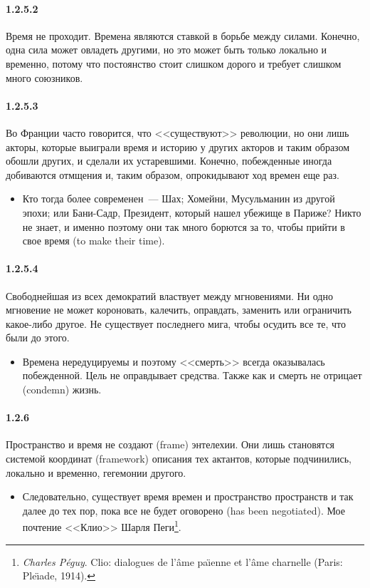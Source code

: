 \paragraph{1.2.5.2}\hypertarget{par:1.2.5.2}{} Время не проходит. Времена являются ставкой в борьбе между силами. Конечно, одна сила может овладеть другими, но это может быть только локально и временно, потому что постоянство стоит слишком дорого и требует слишком много союзников.

\paragraph{1.2.5.3}\hypertarget{par:1.2.5.3}{} Во Франции часто говорится, что <<существуют>> революции, но они лишь акторы, которые выиграли время и историю у других акторов и таким образом обошли других, и сделали их устаревшими. Конечно, побежденные иногда добиваются отмщения и, таким образом, опрокидывают ход времен еще раз.
	\begin{itemize}
	\item Кто тогда более современен~--- Шах; Хомейни, Мусульманин из другой эпохи; или Бани-Садр, Президент, который нашел убежище в Париже? Никто не знает, и именно поэтому они так много борются за то, чтобы прийти в свое время (to make their time).
	\end{itemize}

\paragraph{1.2.5.4}\hypertarget{par:1.2.5.4}{} Свободнейшая из всех демократий властвует между мгновениями. Ни одно мгновение не может короновать, калечить, оправдать, заменить или ограничить какое-либо другое. Не существует последнего мига, чтобы осудить все те, что были до этого.
	\begin{itemize}
	\item Времена нередуцируемы и поэтому <<смерть>> всегда оказывалась побежденной. Цель не оправдывает средства. Также как и смерть не отрицает (condemn) жизнь.
	\end{itemize}

\paragraph{1.2.6}\hypertarget{par:1.2.6}{} Пространство и время не создают (frame) энтелехии. Они лишь становятся системой координат (framework) описания тех актантов, которые подчинились, локально и временно, гегемонии другого. 
	\begin{itemize}
	\item Следовательно, существует время времен и пространство пространств и так далее до тех пор, пока все не будет оговорено (has been negotiated). Мое почтение <<Клио>> Шарля Пеги\footnote{{\itshape Charles P{\'e}guy}. Clio: dialogues de l'{\^a}me pa{\"\i}enne et l'{\^a}me charnelle (Paris: Ple{\"\i}ade, 1914).}.
	\end{itemize}

